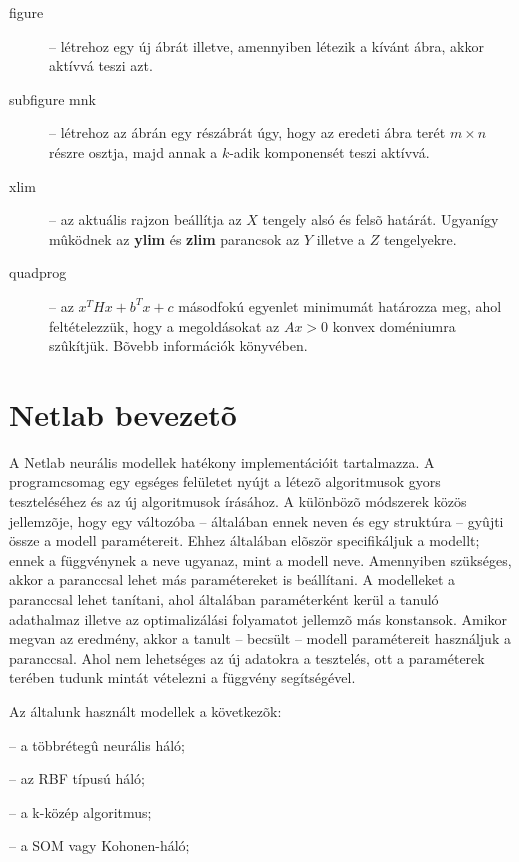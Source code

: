 \begin{description}
    \item[figure] -- létrehoz egy új ábrát illetve, amennyiben létezik a kívánt ábra, akkor aktívvá teszi azt.
    \item[subfigure mnk] -- létrehoz az ábrán egy részábrát úgy, hogy az eredeti ábra terét $m\times n$ részre osztja, majd annak a $k$-adik komponensét teszi aktívvá.
    \item[xlim] -- az aktuális rajzon beállítja az $X$ tengely alsó és felsõ határát. Ugyanígy mûködnek az {\bf ylim} és {\bf zlim} parancsok az $Y$ illetve a $Z$ tengelyekre.
    \item[quadprog] -- az $x^THx + b^Tx + c$ másodfokú egyenlet minimumát határozza meg, ahol feltételezzük, hogy a megoldásokat az $A x>0$ konvex doméniumra szûkítjük. Bõvebb információk  könyvében.
\end{description}

\section{Netlab bevezetõ}\label{sec:MAT:Netlab}

A {Netlab} neurális modellek hatékony implementációit
tartalmazza. A programcsomag egy egséges felületet nyújt a létezõ
algoritmusok gyors teszteléséhez és az új algoritmusok írásához.
A különbözõ módszerek közös jellemzõje, hogy egy változóba --
általában ennek neven  és egy struktúra -- gyûjti össze
a modell paramétereit. Ehhez általában elõször specifikáljuk a
modellt; ennek a függvénynek a neve ugyanaz, mint a modell neve.
Amennyiben szükséges, akkor a  paranccsal
lehet más paramétereket is beállítani. A modelleket a
 paranccsal lehet tanítani, ahol általában
paraméterként kerül a tanuló adathalmaz illetve az optimalizálási
folyamatot jellemzõ más konstansok. Amikor megvan az eredmény,
akkor a tanult -- becsült -- modell paramétereit használjuk a
 paranccsal. Ahol nem lehetséges az új
adatokra a tesztelés, ott a paraméterek terében tudunk mintát
vételezni a  függvény segítségével.

Az általunk használt modellek a következõk:
\begin{description}
    \setlength{\itemsep}{0.04mm}
    \item[mlp] -- a többrétegû neurális háló;
    \item[rbf] -- az RBF típusú háló;
    \item[kmeans] -- a k-közép algoritmus;
    \item[som] -- a SOM vagy Kohonen-háló;
\end{description}

